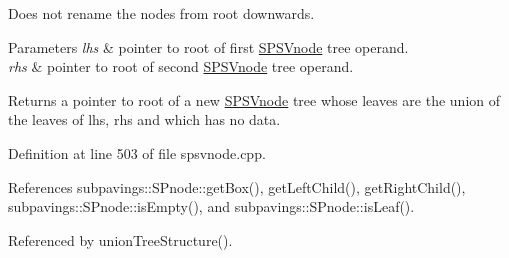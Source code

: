 \-Does not rename the nodes from root downwards.


\begin{DoxyParams}{\-Parameters}
{\em lhs} & pointer to root of first \hyperlink{classsubpavings_1_1SPSVnode}{\-S\-P\-S\-Vnode} tree operand. \\
\hline
{\em rhs} & pointer to root of second \hyperlink{classsubpavings_1_1SPSVnode}{\-S\-P\-S\-Vnode} tree operand. \\
\hline
\end{DoxyParams}
\begin{DoxyReturn}{\-Returns}
a pointer to root of a new \hyperlink{classsubpavings_1_1SPSVnode}{\-S\-P\-S\-Vnode} tree whose leaves are the union of the leaves of lhs, rhs and which has no data. 
\end{DoxyReturn}


\-Definition at line 503 of file spsvnode.\-cpp.



\-References subpavings\-::\-S\-Pnode\-::get\-Box(), get\-Left\-Child(), get\-Right\-Child(), subpavings\-::\-S\-Pnode\-::is\-Empty(), and subpavings\-::\-S\-Pnode\-::is\-Leaf().



\-Referenced by union\-Tree\-Structure().


